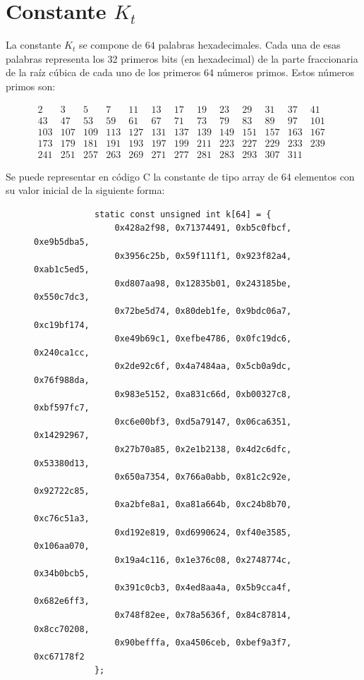 \documentclass{article}
\begin{document}
\section{Constante $K_{t}$}
    La constante $K_{t}$ se compone de $64$ palabras hexadecimales. Cada una de esas palabras representa los 32 primeros bits (en hexadecimal) de la parte fraccionaria de la raíz cúbica de cada uno de los primeros 64 números primos. Estos números primos son:
        \begin{figure}[H]
        \centering
        $\begin{array}{llllllllllllllll}
            2 & 3 & 5 & 7 & 11 & 13 & 17 & 19 & 23 & 29 & 31 & 37 & 41 \\
            43 & 47 & 53 & 59 & 61 & 67 & 71 & 73 & 79 & 83 & 89 & 97 & 101 \\
            103 & 107 & 109 & 113 & 127 & 131 & 137 & 139 & 149 & 151 & 157 & 163 & 167 \\
            173 & 179 & 181 & 191 & 193 & 197 & 199 & 211 & 223 & 227 & 229 & 233 & 239 \\
            241 & 251 & 257 & 263 & 269 & 271 & 277 & 281 & 283 & 293 & 307 & 311 & & & &
        \end{array}$
        \end{figure}
    
    Se puede representar en código C la constante de tipo array de 64 elementos con su valor inicial de la siguiente forma:
        \begin{figure}[H]
        \centering
            \begin{verbatim}
            static const unsigned int k[64] = {
            	0x428a2f98, 0x71374491, 0xb5c0fbcf, 0xe9b5dba5,
            	0x3956c25b, 0x59f111f1, 0x923f82a4, 0xab1c5ed5,
            	0xd807aa98, 0x12835b01, 0x243185be, 0x550c7dc3,
            	0x72be5d74, 0x80deb1fe, 0x9bdc06a7, 0xc19bf174,
            	0xe49b69c1, 0xefbe4786, 0x0fc19dc6, 0x240ca1cc,
            	0x2de92c6f, 0x4a7484aa, 0x5cb0a9dc, 0x76f988da,
            	0x983e5152, 0xa831c66d, 0xb00327c8, 0xbf597fc7,
            	0xc6e00bf3, 0xd5a79147, 0x06ca6351, 0x14292967,
            	0x27b70a85, 0x2e1b2138, 0x4d2c6dfc, 0x53380d13,
            	0x650a7354, 0x766a0abb, 0x81c2c92e, 0x92722c85,
            	0xa2bfe8a1, 0xa81a664b, 0xc24b8b70, 0xc76c51a3,
            	0xd192e819, 0xd6990624, 0xf40e3585, 0x106aa070,
            	0x19a4c116, 0x1e376c08, 0x2748774c, 0x34b0bcb5,
            	0x391c0cb3, 0x4ed8aa4a, 0x5b9cca4f, 0x682e6ff3,
            	0x748f82ee, 0x78a5636f, 0x84c87814, 0x8cc70208,
            	0x90befffa, 0xa4506ceb, 0xbef9a3f7, 0xc67178f2
            };
            \end{verbatim}
        \end{figure}
\end{document}
